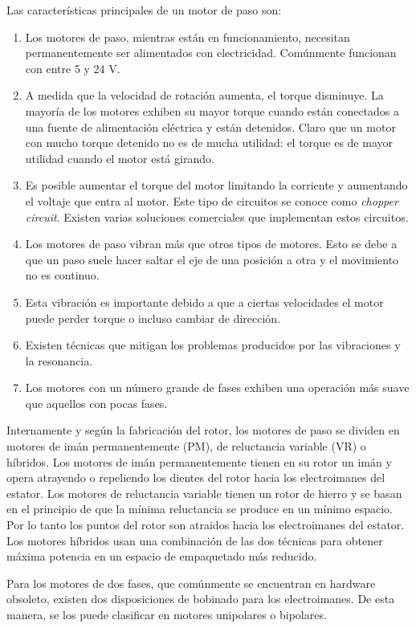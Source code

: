 \documentclass[final,narroweqnarray,inline,twoside]{ieee}
\begin{document}
Las características principales de un motor de paso son:
\begin{enumerate}
 \item Los motores de paso, mientras están en funcionamiento, necesitan permanentemente ser alimentados con electricidad.
Comúnmente funcionan con entre 5 y 24 V.
 \item A medida que la velocidad de rotación aumenta, el torque disminuye. La mayoría de los motores exhiben su mayor torque
cuando están conectados a una fuente de alimentación eléctrica y están detenidos. Claro que un motor con mucho torque
detenido no es de mucha utilidad: el torque es de mayor utilidad cuando el motor está girando.
 \item Es posible aumentar el torque del motor limitando la corriente y aumentando el voltaje que entra al motor. Este tipo
de circuitos se conoce como \textit{chopper circuit}. Existen varias soluciones comerciales que implementan estos circuitos.
 \item Los motores de paso vibran más que otros tipos de motores. Esto se debe a que un paso suele hacer saltar el eje de
una posición a otra y el movimiento no es continuo.
 \item Esta vibración es importante debido a que a ciertas velocidades el motor puede perder torque o incluso cambiar de
dirección.
 \item Existen técnicas que mitigan los problemas producidos por las vibraciones y la resonancia.
 \item Los motores con un número grande de fases exhiben una operación más suave que aquellos con pocas fases.
\end{enumerate}
Internamente y según la fabricación del rotor, los motores de paso se dividen en motores de imán permanentemente (PM), de
reluctancia variable (VR) o híbridos. Los motores de imán permanentemente tienen en su rotor un imán y opera atrayendo o
repeliendo los dientes del rotor hacia los electroimanes del estator. Los motores de reluctancia variable tienen un rotor de
hierro y se basan en el principio de que la mínima reluctancia se produce en un mínimo espacio. Por lo tanto los puntos del
rotor son atraidos hacia los electroimanes del estator. Los motores híbridos usan una combinación de las dos técnicas para
obtener máxima potencia en un espacio de empaquetado más reducido.

Para los motores de dos fases, que comúnmente se encuentran en hardware obsoleto, existen dos disposiciones de bobinado para
los electroimanes. De esta manera, se los puede clasificar en motores unipolares o bipolares.
\end{document}
